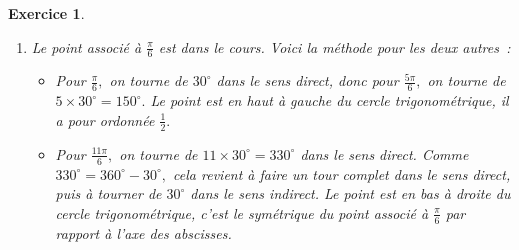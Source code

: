\documentclass[10pt]{article}
\newtheorem{exo}{Exercice}
\begin{document}
\begin{exo}
\begin{enumerate}
\begin{multicols}{3}
$\sin \frac{\pi}{3}=\frac{\sqrt{3}}{2}$

\columnbreak

$\cos \frac{2\pi}{3}=-\frac{1}{2}$

$\sin \frac{2\pi}{3}=\frac{\sqrt{3}}{2}$

\columnbreak


$\cos \left(-\frac{\pi}{3}\right)=\frac{1}{2}$

$\sin \left(-\frac{\pi}{3}\right)=-\frac{\sqrt{3}}{2}$

\end{multicols}


\item \begin{multicols}{2} Le point associé à $\frac{\pi} {6}$ est dans le cours. Voici la méthode pour les deux autres~:

\begin{itemize}
\item[\textbullet] Pour $\frac{\pi} {6},$ on tourne de $30^{\circ}$ dans le sens direct, donc pour $\frac{5\pi}{6},$ on tourne de $5\times 30^{\circ}=150^{\circ}.$ Le point est en haut à gauche du cercle trigonométrique, il a pour ordonnée $\frac{1}{2}.$
\item[\textbullet] Pour $\frac{11\pi} {6},$ on tourne de $11\times 30^{\circ}=330^{\circ}$ dans le sens direct. Comme $330^{\circ}=360^{\circ}-30^{\circ},$ cela revient à faire un tour complet dans le sens direct, puis à tourner de $30^{\circ}$ dans le sens indirect. Le point est en bas à droite du cercle trigonométrique, c'est le symétrique du point associé à $\frac{\pi}{6}$ par rapport à l'axe des abscisses.
\end{itemize}



\end{multicols}
\end{enumerate}
\end{exo}
\end{document}
